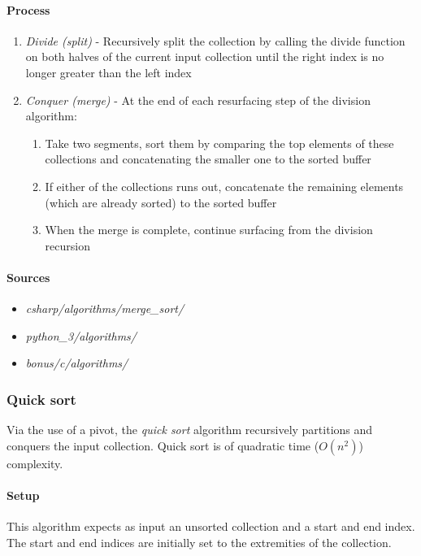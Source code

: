 \documentclass{article}
\begin{document}
\paragraph{Process}
\begin{enumerate}
\item{{\em Divide (split)} - Recursively split the collection by calling the divide function on both halves of the
current input collection until the right index is no longer greater than the left index}
\item{{\em Conquer (merge)} - At the end of each resurfacing step of the division algorithm:}
  \begin{enumerate}
  \item{Take two segments, sort them by comparing the top elements of these collections and concatenating the smaller
    one to the sorted buffer}
  \item{If either of the collections runs out, concatenate the remaining elements (which are already sorted) to the
    sorted buffer}
  \item{When the merge is complete, continue surfacing from the division recursion}
  \end{enumerate}
\end{enumerate}

\begin{samepage}
  \paragraph{Sources}
  \begin{itemize}
  \item{{\em csharp/algorithms/merge\_sort/}}
  \item{{\em python\_3/algorithms/}}
  \item{{\em bonus/c/algorithms/}}
  \end{itemize}
\end{samepage}


\subsubsection{Quick sort}
Via the use of a pivot, the {\em quick sort} algorithm recursively partitions and conquers the input collection.
Quick sort is of quadratic time (\(O(n^2)\)) complexity.

\paragraph{Setup}
This algorithm expects as input an unsorted collection and a start and end index. The start and end indices are
initially set to the extremities of the collection.
\end{document}
